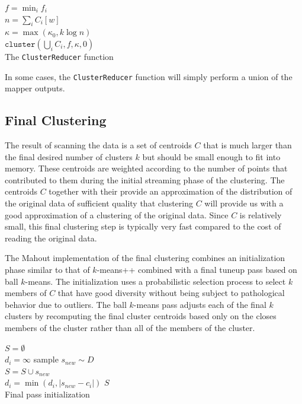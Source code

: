 \documentclass[11pt]{amsart}
\begin{document}
\begin{algorithm}[H]
\SetNoFillComment
{}
$f = \min_i f_i$ \\
$n = \sum_i C_i[w]$\\
$\kappa = \max\left(\kappa_0, k \log n \right)$\\
\Return $ \mathtt {cluster}( \bigcup_i C_i, f, \kappa, 0)$\\
\caption{The {\tt ClusterReducer} function}
\end{algorithm}

In some cases, the {\tt ClusterReducer} function will simply perform a union of the mapper outputs.

\subsection{Final Clustering}
The result of scanning the data is a set of centroids $C$ that is much larger than the final desired number of clusters $k$ but should be small enough to fit into memory.  These centroids are weighted according to the number of points that contributed to them during the initial streaming phase of the clustering.  The centroids $C$ together with their provide an approximation of the distribution of the original data of sufficient quality that clustering $C$ will provide us with a good approximation of a clustering of the original data.  Since $C$ is relatively small, this final clustering step is typically very fast compared to the cost of reading the original data.

The Mahout implementation of the final clustering combines an initialization phase similar to that of $k$-means++ combined with a final tuneup pass based on ball $k$-means.  The initialization uses a probabilistic selection process to select $k$ members of $C$ that have good diversity without being subject to pathological behavior due to outliers.  The ball $k$-means pass adjusts each of the final $k$ clusters by recomputing the final cluster centroids based only on the closes members of the cluster rather than all of the members of the cluster.
\begin{algorithm}[H]
\SetNoFillComment
{}
$S = \emptyset$ \\
 {
$ d_i = \infty $ 
}
 {
sample $s_{new} \sim D$ \\
$S = S \cup s_{new}$ \\
 {
$d_i = \min (d_i , | s_{new} - c_i |)$
}
}
\Return $ S $\\
\caption{Final pass initialization}
\end{algorithm}
\end{document}
